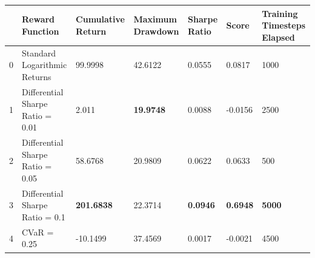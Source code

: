 \begin{tabular}{lllllll}
\toprule
 & Reward Function & Cumulative Return & Maximum Drawdown & Sharpe Ratio & Score & Training Timesteps Elapsed \\
\midrule
0 & Standard Logarithmic Returns & 99.9998 & 42.6122 & 0.0555 & 0.0817 & 1000 \\
1 & Differential Sharpe Ratio = 0.01 & 2.011 & \textbf{19.9748} & 0.0088 & -0.0156 & 2500 \\
2 & Differential Sharpe Ratio = 0.05 & 58.6768 & 20.9809 & 0.0622 & 0.0633 & 500 \\
3 & Differential Sharpe Ratio = 0.1 & \textbf{201.6838} & 22.3714 & \textbf{0.0946} & \textbf{0.6948} & \textbf{5000} \\
4 & CVaR = 0.25 & -10.1499 & 37.4569 & 0.0017 & -0.0021 & 4500 \\
\bottomrule
\end{tabular}
